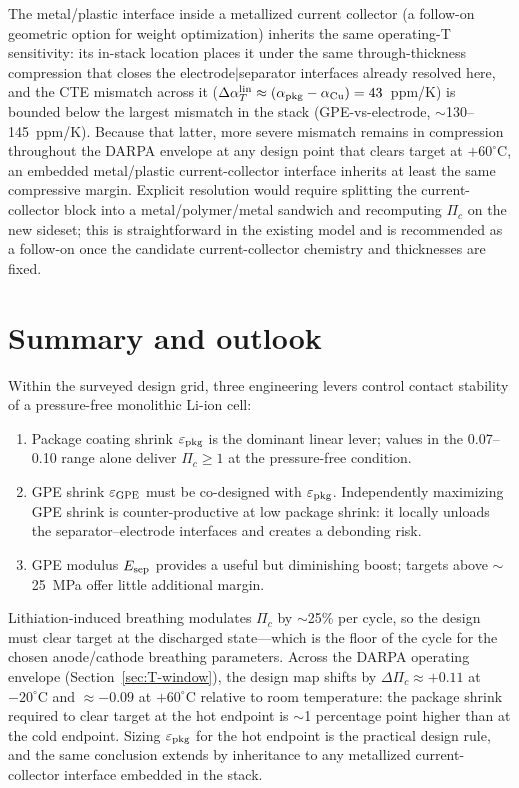 \documentclass[11pt,letterpaper]{article}
\begin{document}
The metal/plastic interface inside a metallized current collector
(a follow-on geometric option for weight optimization) inherits the
same operating-T sensitivity: its in-stack location places it under
the same through-thickness compression that closes the
electrode$|$separator interfaces already resolved here, and the
CTE mismatch across it ($\Delta\alpha_T^{\rm lin} \approx
(\alpha_{\rm pkg} - \alpha_{\rm Cu}) = 43$~ppm/K) is bounded
below the largest mismatch in the stack (GPE-vs-electrode,
$\sim$130--145~ppm/K).  Because that latter, more severe mismatch
remains in compression throughout the DARPA envelope at any
design point that clears target at $+60^\circ$C, an embedded
metal/plastic current-collector interface inherits at least the
same compressive margin.  Explicit resolution would require
splitting the current-collector block into a metal/polymer/metal
sandwich and recomputing $\Pi_c$ on the new sideset; this is
straightforward in the existing model and is recommended as a
follow-on once the candidate current-collector chemistry and
thicknesses are fixed.

\section{Summary and outlook}

Within the surveyed design grid, three engineering levers control
contact stability of a pressure-free monolithic Li-ion cell:

\begin{enumerate}
\item Package coating shrink $\varepsilon_{\rm pkg}$ is the dominant
linear lever; values in the 0.07--0.10 range alone deliver $\Pi_c \ge
1$ at the pressure-free condition.
\item GPE shrink $\varepsilon_{\rm GPE}$ must be co-designed with
$\varepsilon_{\rm pkg}$.  Independently maximizing GPE shrink is
counter-productive at low package shrink: it locally unloads the
separator--electrode interfaces and creates a debonding risk.
\item GPE modulus $E_{\rm sep}$ provides a useful but diminishing
boost; targets above $\sim$25~MPa offer little additional margin.
\end{enumerate}

Lithiation-induced breathing modulates $\Pi_c$ by $\sim$25\% per
cycle, so the design must clear target at the discharged state---which
is the floor of the cycle for the chosen anode/cathode breathing
parameters.  Across the DARPA operating envelope
(Section~\ref{sec:T-window}), the design map shifts by
$\Delta\Pi_c\approx +0.11$ at $-20^\circ$C and $\approx -0.09$ at
$+60^\circ$C relative to room temperature: the package shrink
required to clear target at the hot endpoint is $\sim$1 percentage
point higher than at the cold endpoint.  Sizing $\varepsilon_{\rm
pkg}$ for the hot endpoint is the practical design rule, and the
same conclusion extends by inheritance to any metallized
current-collector interface embedded in the stack.
\end{document}
